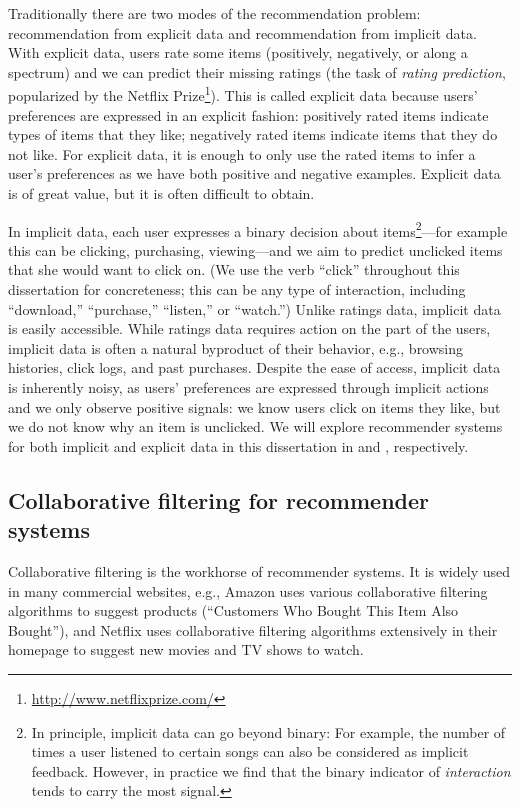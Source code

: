 Traditionally there are two modes of the recommendation problem: recommendation from explicit data and recommendation from implicit data.  With explicit
data, users rate some items (positively, negatively, or along a
spectrum) and we can predict their missing ratings (the task of \textit{rating prediction}, popularized by the Netflix Prize\footnote{\url{http://www.netflixprize.com/}}). This is called explicit data because users' preferences are expressed in an explicit fashion: positively rated items indicate types of items that they
like; negatively rated items indicate items that they do not like. For explicit data, it is enough to only use the rated items to infer a user's
preferences as we have both positive and negative examples. Explicit data is of great value, but it is often difficult to obtain. 

In implicit data, each user expresses a binary decision about items\footnote{In principle, implicit data can go beyond binary: For example, the number of times a user listened to certain songs can also be considered as implicit feedback. However, in practice we find that the binary indicator of \textit{interaction} tends to carry the most signal. }---for
example this can be clicking, purchasing, viewing---and we aim to
predict unclicked items that she would want to click on. (We use the verb ``click'' throughout this dissertation for concreteness; this can be any type of interaction, including
``download,'' ``purchase,'' ``listen,'' or ``watch.'') Unlike
ratings data, implicit data is easily accessible. While ratings data
requires action on the part of the users, implicit data is often a
natural byproduct of their behavior, e.g., browsing histories, click
logs, and past purchases. Despite the ease of access, implicit data is inherently noisy, as users' preferences are expressed through implicit actions and we only observe positive signals: we know users click on items they like, but we do not know why an item is unclicked. We will explore recommender systems for both implicit and explicit data in this dissertation in  and , respectively.

\subsection{Collaborative filtering for recommender systems} \label{chpt:background:sec:cf}

Collaborative filtering is the workhorse of recommender systems. It is widely used in many commercial websites, e.g., Amazon uses various collaborative filtering algorithms to suggest products (``Customers Who Bought This Item Also Bought''), and Netflix uses collaborative filtering algorithms extensively in their homepage to suggest new movies and TV shows to watch.

